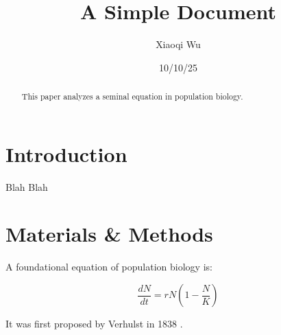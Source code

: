 \documentclass[12pt]{article}
\title{A Simple Document}
\author{Xiaoqi Wu}
\date{10/10/25}
\begin{document}
  \maketitle
  
  \begin{abstract}
    This paper analyzes a seminal equation in population biology.
  \end{abstract}
  
  \section{Introduction}
    Blah Blah
  
  \section{Materials \& Methods}
  
  A foundational equation of population biology is:
  
  \begin{equation}
    \frac{dN}{dt} = r N \left(1 - \frac{N}{K}\right)
  \end{equation}
  
  It was first proposed by Verhulst in 1838 \cite{verhulst1838notice}.
  
  
  
\end{document}
